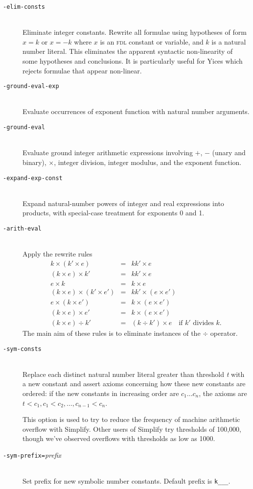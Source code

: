 \documentclass[12pt,fleqn]{article}
\newcommand{\fdl}{\textsc{fdl}}
\newcommand{\optionb}[1]{\item[\texttt{-{#1}}]\ \\}
\newcommand{\optionv}[2]{\item[\texttt{-{#1}=}\mdseries\textit{#2}]\ \\}
\begin{document}
\begin{description}
\optionb{elim-consts}
  Eliminate integer constants. Rewrite all formulae using hypotheses of
  form $x = k$ or $x = -k$ where $x$ is an \fdl{} constant or variable,
  and $k$ is a natural number literal.  This eliminates the apparent
  syntactic non-linearity of some hypotheses and conclusions.  It is
  particularly useful for Yices which rejects formulae that appear
  non-linear.


\optionb{ground-eval-exp}
  Evaluate occurrences of exponent function with natural number arguments.

\optionb{ground-eval}
  Evaluate ground integer arithmetic expressions involving $+$, $-$
  (unary and binary), $\times$, integer division, integer modulus, and
  the exponent function.

\optionb{expand-exp-const}
  Expand natural-number powers of integer and real expressions into products,
  with special-case treatment for exponents 0 and 1.

\optionb{arith-eval}
  Apply the rewrite rules
  \begin{eqnarray*}
   k \times (k' \times e)   & =  &  kk' \times e \\
   (k \times e) \times k'   & =  &  kk' \times e \\
   e \times k               & =  &  k \times e \\
   (k \times e) \times (k' \times e') &  =  &  kk' \times (e \times e') \\
   e \times (k \times e')   &  = &  k \times (e \times e')  \\
   (k \times e) \times e'   & =  &  k \times (e \times e')  \\
  (k \times e) \div k'      & =  &   (k \div k') \times e  
      \quad\mbox{if $k'$ divides $k$}.
  \end{eqnarray*}
  The main aim of these rules is to eliminate instances of the $\div$
  operator.

\optionb{sym-consts}
  Replace each distinct natural number literal greater than 
  threshold \textit{t} with a new constant and assert axioms concerning
  how these new constants are ordered: if the new constants in increasing
  order are $c_1 \ldots c_n$, the axioms are 
  $t < c_1, c_1 < c_2, \ldots, c_{n-1} < c_n$.

  This option is used to try to reduce the frequency of machine
  arithmetic overflow with Simplify.  Other users of Simplify try
  thresholds of 100,000, though we've observed overflows with
  thresholds as low as 1000.

\optionv{sym-prefix}{prefix}
  Set prefix for new symbolic number constants.  Default prefix is
  \texttt{k\_\_\_}.


\end{description}
\end{document}
